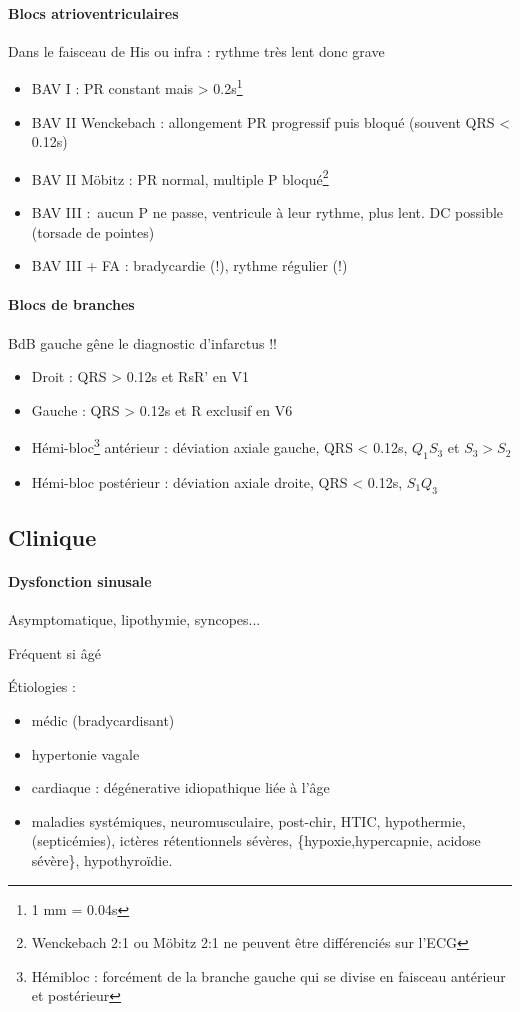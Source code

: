 \paragraph{Blocs atrioventriculaires}
Dans le faisceau de His ou infra : rythme très lent donc grave \skull
\begin{itemize}
  \item BAV I : PR constant mais > 0.2s\footnote{1 mm = 0.04s}
  \item BAV II Wenckebach : allongement PR progressif puis bloqué (souvent QRS
    < 0.12s)
  \item BAV II Möbitz : PR normal, multiple P bloqué\footnote{Wenckebach 2:1 ou
    Möbitz 2:1 ne peuvent être différenciés sur l'ECG}
  \item BAV III : aucun P ne passe, ventricule à leur rythme, plus lent.
    \danger{} DC possible (torsade de pointes)
  \item BAV III + FA : bradycardie (!), rythme
    régulier (!)
\end{itemize}

\paragraph{Blocs de branches}
\danger{} BdB gauche gêne le diagnostic d'infarctus !!
\begin{itemize}
  \item Droit : QRS > 0.12s et RsR' en V1 
  \item Gauche : QRS > 0.12s et R exclusif en V6 
  \item Hémi-bloc\footnote{Hémibloc : forcément de la branche gauche qui se
    divise en faisceau antérieur et postérieur} antérieur : déviation axiale
  gauche, QRS < 0.12s, $Q_1S_3$ et $S_3 > S_2$
  \item Hémi-bloc postérieur : déviation axiale droite, QRS < 0.12s, $S_1Q_3$

\end{itemize}

\subsection{Clinique}
\paragraph{Dysfonction sinusale}
Asymptomatique, lipothymie, syncopes...

Fréquent si âgé

Étiologies :
\begin{itemize}
\item médic (bradycardisant)
\item hypertonie vagale
\item cardiaque : dégénerative idiopathique liée à l'âge
\item  maladies systémiques, neuromusculaire,
post-chir, HTIC, hypothermie, (septicémies), ictères rétentionnels sévères,
\{hypoxie,hypercapnie, acidose sévère\}, hypothyroïdie.
\end{itemize}

